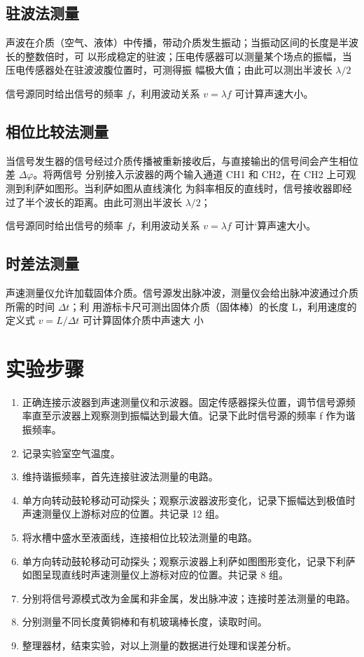 \documentclass[10pt,a4paper]{article}	%
\begin{document}
	\subsection{驻波法测量}
	声波在介质（空气、液体）中传播，带动介质发生振动；当振动区间的长度是半波长的整数倍时，可
	以形成稳定的驻波；压电传感器可以测量某个场点的振幅，当压电传感器处在驻波波腹位置时，可测得振
	幅极大值；由此可以测出半波长 $\lambda / 2$

	信号源同时给出信号的频率 $f$，利用波动关系 $v = \lambda f$ 可计算声速大小。
	\subsection{相位比较法测量}
	当信号发生器的信号经过介质传播被重新接收后，与直接输出的信号间会产生相位差 $\Delta \varphi$。将两信号
	分别接入示波器的两个输入通道 CH1 和 CH2，在 CH2 上可观测到利萨如图形。当利萨如图从直线演化
	为斜率相反的直线时，信号接收器即经过了半个波长的距离。由此可测出半波长 $\lambda / 2$；

	信号源同时给出信号的频率 $f$，利用波动关系 $v = \lambda f$ 可计`算声速大小。
	\subsection{时差法测量}
	声速测量仪允许加载固体介质。信号源发出脉冲波，测量仪会给出脉冲波通过介质所需的时间 $\Delta t$；利
	用游标卡尺可测出固体介质（固体棒）的长度 L，利用速度的定义式 $v = {L}/{\Delta t}$ 可计算固体介质中声速大
	小
	\section{实验步骤}
	\begin{enumerate}
		\item 正确连接示波器到声速测量仪和示波器。固定传感器探头位置，调节信号源频率直至示波器上观察测到振幅达到最大值。记录下此时信号源的频率 f 作为谐振频率。
		\item 记录实验室空气温度。
		\item 维持谐振频率，首先连接驻波法测量的电路。
		\item 单方向转动鼓轮移动可动探头；观察示波器波形变化，记录下振幅达到极值时声速测量仪上游标对应的位置。共记录 12 组。

		\item 将水槽中盛水至液面线，连接相位比较法测量的电路。
		\item 单方向转动鼓轮移动可动探头；观察示波器上利萨如图图形变化，记录下利萨如图呈现直线时声速测量仪上游标对应的位置。共记录 8 组。
		
		\item 分别将信号源模式改为金属和非金属，发出脉冲波；连接时差法测量的电路。
		\item 分别测量不同长度黄铜棒和有机玻璃棒长度，读取时间。
		\item 整理器材，结束实验，对以上测量的数据进行处理和误差分析。
	\end{enumerate}
\end{document}

